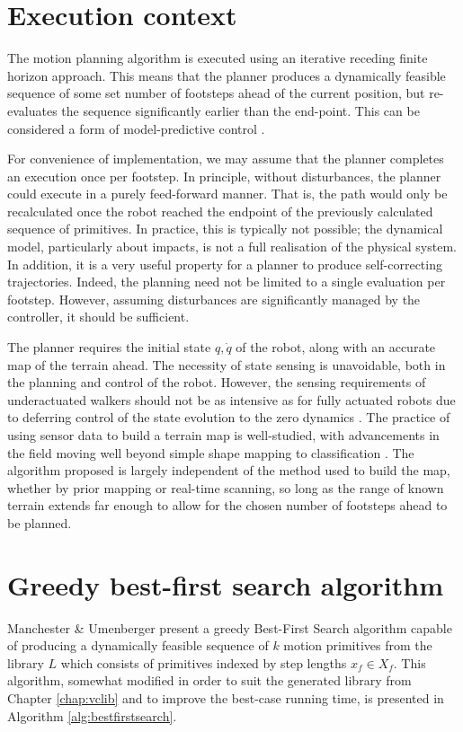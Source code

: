 \section{Execution context}
The motion planning algorithm is executed using an iterative receding finite horizon approach. This means that the planner produces a dynamically feasible sequence of some set number of footsteps ahead of the current position, but re-evaluates the sequence significantly earlier than the end-point. This can be considered a form of model-predictive control \cite{camacho2013model}.

For convenience of implementation, we may assume that the planner completes an execution once per footstep. In principle, without disturbances, the planner could execute in a purely feed-forward manner. That is, the path would only be recalculated once the robot reached the endpoint of the previously calculated sequence of primitives. In practice, this is typically not possible; the dynamical model, particularly about impacts, is not a full realisation of the physical system. In addition, it is a very useful property for a planner to produce self-correcting trajectories. Indeed, the planning need not be limited to a single evaluation per footstep. However, assuming disturbances are significantly managed by the controller, it should be sufficient.

The planner requires the initial state $q,\dot{q}$ of the robot, along with an accurate map of the terrain ahead. The necessity of state sensing is unavoidable, both in the planning and control of the robot. However, the sensing requirements of underactuated walkers should not be as intensive as for fully actuated robots due to deferring control of the state evolution to the zero dynamics \cite{collins2005efficient}. The practice of using sensor data to build a terrain map is well-studied, with advancements in the field moving well beyond simple shape mapping to classification \cite{herbert1989terrain, triebel2006multi, brooks2007self}. The algorithm proposed is largely independent of the method used to build the map, whether by prior mapping or real-time scanning, so long as the range of known terrain extends far enough to allow for the chosen number of footsteps ahead to be planned.

\section{Greedy best-first search algorithm}
Manchester \& Umenberger \cite{manchester13planning} present a greedy Best-First Search algorithm capable of producing a dynamically feasible sequence of $k$ motion primitives from the library $L$ which consists of primitives indexed by step lengths $x_f\in X_f$. This algorithm, somewhat modified in order to suit the generated library from Chapter \ref{chap:vclib} and to improve the best-case running time, is presented in Algorithm \ref{alg:bestfirstsearch}. 

